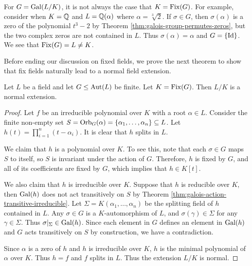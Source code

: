 \begin{example}
    For $G = \operatorname{Gal}(L/K)$, it is not always the case that $K = \operatorname{Fix}(G)$. For example, consider when $K = \mathbb Q$ and $L = \mathbb Q (\alpha)$ where $\alpha = \sqrt[3]{2}$. If $\sigma \in G$, then $\sigma(\alpha)$ is a zero of the polynomial $t^3 - 2$ by Theorem \ref{thm:galois-group-permutes-zeros}, but the two complex zeros are not contained in $L$. Thus $\sigma(\alpha) = \alpha$ and $G = \{ \operatorname{Id} \}$. We see that $\operatorname{Fix}(G) = L \neq K$. 
\end{example}



Before ending our discussion on fixed fields, we prove the next theorem to show that fix fields naturally lead to a normal field extension. 

\begin{theorem} \label{thm:fix-extension-normal}
	Let $L$ be a field and let $G \le \operatorname{Aut}(L)$ be finite. Let $K = \operatorname{Fix}(G)$. Then $L/K$ is a normal extension.
\end{theorem}

\begin{proof}
	
	Let $f$ be an irreducible polynomial over $K$ with a root $\alpha \in L$. Consider the finite non-empty set $S = \operatorname{Orb}_G(\alpha) = \{ \alpha_1, \ldots, \alpha_n\} \subseteq L$. Let $h(t) = \prod_{i = 1} ^n (t - \alpha_i)$. It is clear that $h$ splits in $L$.
	
	We claim that $h$ is a polynomial over $K$. To see this, note that each $\sigma \in G$ maps $S$ to itself, so $S$ is invariant under the action of $G$. Therefore, $h$ is fixed by $G$, and all of its coefficients are fixed by $G$, which implies that $h \in K[t]$.
	
	We also claim that $h$ is irreducible over $K$. Suppose that $h$ is reducible over $K$, then $\operatorname{Gal}(h)$ does not act transitively on $S$ by Theorem \ref{thm:galois-action-transitive-irreducible}. Let $\Sigma = K(\alpha_1, \dots, \alpha_n)$ be the splitting field of $h$ contained in $L$.  Any $\sigma \in G$ is a $K$-automorphism of $L$, and $\sigma(\gamma) \in \Sigma$ for any $\gamma \in \Sigma$. Thus $\sigma | _ \Sigma \in \operatorname{Gal}(h)$. 
	Since each element in $G$ defines an element in $\operatorname{Gal}(h)$ and $G$ acts transitively on $S$ by construction, we have a contradiction. 
	
	Since $\alpha$ is a zero of $h$ and $h$ is irreducible over $K$, $h$ is the minimal polynomial of $\alpha$ over $K$. Thus $h = f$ and $f$ splits in $L$. Thus the extension $L/K$ is normal. 
\end{proof}
